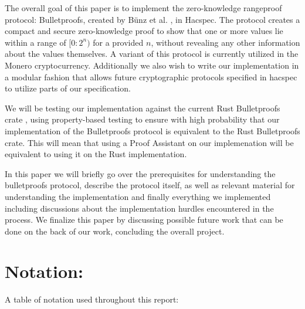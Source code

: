 \documentclass{article}
\begin{document}
The overall goal of this paper is to implement the zero-knowledge
rangeproof protocol: Bulletproofs, created by Bünz et
al. \cite{bulletproofs}, in Hacspec. The protocol creates a compact and
secure zero-knowledge proof to show that one or more values lie within
a range of $[0:2^n)$ for a provided $n$, without revealing any other
information about the values themselves. A variant of this protocol
is currently utilized in the Monero cryptocurrency. Additionally we
also wish to write our implementation in a modular fashion that allows
future cryptographic protocols specified in hacspec to utilize parts
of our specification.

We will be testing our implementation against the current Rust
Bulletproofs crate \cite{dalek}, using property-based testing to ensure 
with high probability that our implementation of the Bulletproofs 
protocol is equivalent to the Rust Bulletproofs crate. This will mean
that using a Proof Assistant on our implemenation will be equivalent
to using it on the Rust implementation.

In this paper we will briefly go over the prerequisites for
understanding the bulletproofs protocol, describe the protocol itself, 
as well as relevant material for understanding the implementation and
finally everything we implemented including discussions about the
implementation hurdles encountered in the process. We finalize this
paper by discussing possible future work that can be done on the back
of our work, concluding the overall project.


\newpage

\section{Notation:} \label{notation}

A table of notation used throughout this report:
\end{document}
